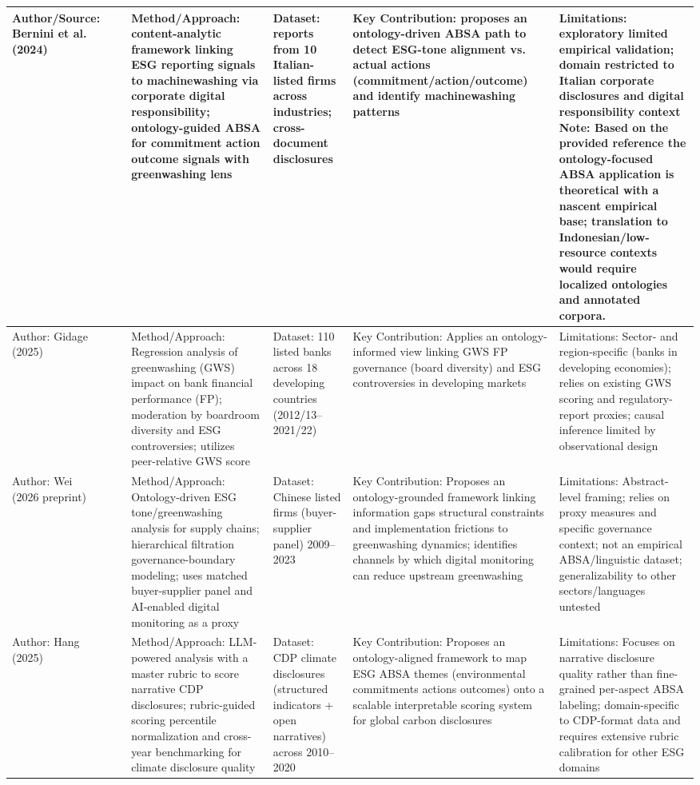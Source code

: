 \documentclass{article}
\begin{document}
\begin{landscape}
\begin{longtable}{p{1.8cm}
p{2.6cm}
p{3.4cm}
p{2.6cm}
p{3.5cm}
p{3.5cm}}
Author/Source: Bernini et al. (2024) & ~ & Method/Approach: content-analytic framework linking ESG reporting signals to machinewashing via corporate digital responsibility; ontology-guided ABSA for commitment action outcome signals with greenwashing lens & Dataset: reports from 10 Italian-listed firms across industries; cross-document disclosures & Key Contribution: proposes an ontology-driven ABSA path to detect ESG-tone alignment vs. actual actions (commitment/action/outcome) and identify machinewashing patterns & Limitations: exploratory limited empirical validation; domain restricted to Italian corporate disclosures and digital responsibility context Note: Based on the provided reference the ontology-focused ABSA application is theoretical with a nascent empirical base; translation to Indonesian/low-resource contexts would require localized ontologies and annotated corpora. \\ \hline
Author: Gidage (2025) & ~ & Method/Approach: Regression analysis of greenwashing (GWS) impact on bank financial performance (FP); moderation by boardroom diversity and ESG controversies; utilizes peer-relative GWS score & Dataset: 110 listed banks across 18 developing countries (2012/13–2021/22) & Key Contribution: Applies an ontology-informed view linking GWS FP governance (board diversity) and ESG controversies in developing markets & Limitations: Sector- and region-specific (banks in developing economies); relies on existing GWS scoring and regulatory-report proxies; causal inference limited by observational design \\ \hline
Author: Wei (2026 preprint) & ~ & Method/Approach: Ontology-driven ESG tone/greenwashing analysis for supply chains; hierarchical filtration governance-boundary modeling; uses matched buyer-supplier panel and AI-enabled digital monitoring as a proxy & Dataset: Chinese listed firms (buyer-supplier panel) 2009–2023 & Key Contribution: Proposes an ontology-grounded framework linking information gaps structural constraints and implementation frictions to greenwashing dynamics; identifies channels by which digital monitoring can reduce upstream greenwashing & Limitations: Abstract-level framing; relies on proxy measures and specific governance context; not an empirical ABSA/linguistic dataset; generalizability to other sectors/languages untested \\ \hline
Author: Hang (2025) & ~ & Method/Approach: LLM-powered analysis with a master rubric to score narrative CDP disclosures; rubric-guided scoring percentile normalization and cross-year benchmarking for climate disclosure quality & Dataset: CDP climate disclosures (structured indicators + open narratives) across 2010–2020 & Key Contribution: Proposes an ontology-aligned framework to map ESG ABSA themes (environmental commitments actions outcomes) onto a scalable interpretable scoring system for global carbon disclosures & Limitations: Focuses on narrative disclosure quality rather than fine-grained per-aspect ABSA labeling; domain-specific to CDP-format data and requires extensive rubric calibration for other ESG domains \\ \hline

\end{longtable}
\end{landscape}
\end{document}
